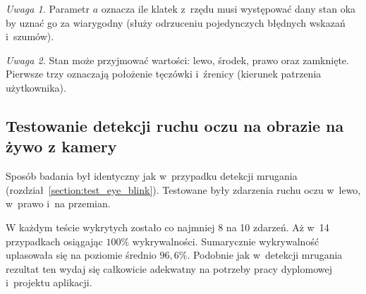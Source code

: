 \vspace{3mm}

\textit{Uwaga 1.} Parametr $a$ oznacza ile klatek z~rzędu musi występować dany stan oka by uznać go za wiarygodny (służy odrzuceniu pojedynczych błędnych wskazań i~szumów).

\par

\textit{Uwaga 2.} Stan może przyjmować wartości: lewo, środek, prawo oraz zamknięte. Pierwsze trzy oznaczają położenie tęczówki i~źrenicy (kierunek patrzenia użytkownika). 




\subsection{Testowanie detekcji ruchu oczu na obrazie na żywo z kamery}

Sposób badania był identyczny jak w~przypadku detekcji mrugania (rozdział~\ref{section:test_eye_blink}). Testowane były zdarzenia ruchu oczu w~lewo, w~prawo i~na przemian.



W każdym teście wykrytych zostało co najmniej 8 na 10 zdarzeń. Aż w~14 przypadkach osiągając $100\%$ wykrywalności. Sumarycznie wykrywalność uplasowała się na poziomie średnio $96,6\%$. Podobnie jak w~detekcji mrugania rezultat ten wydaj się całkowicie adekwatny na potrzeby pracy dyplomowej i~projektu aplikacji. 